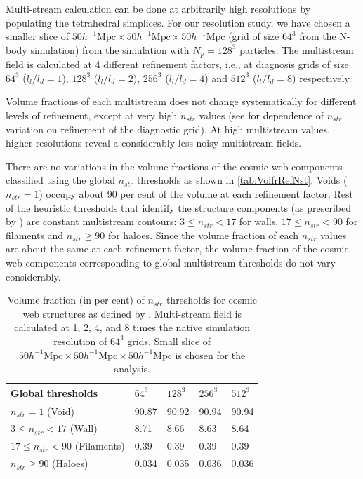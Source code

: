 Multi-stream calculation can be done at arbitrarily high resolutions by populating the tetrahedral simplices. For our resolution study, we have chosen a smaller slice of $ 50 h^{-1} \text{Mpc} \times 50 h^{-1} \text{Mpc} \times 50 h^{-1} \text{Mpc}$ (grid of size $64^3$ from the N-body simulation) from the simulation with $N_p = 128^3$ particles. The multistream field is calculated at 4 different refinement factors, i.e., at diagnosis grids of size $64^3$ ($l_l/l_d = 1$), $128^3$ ($l_l/l_d = 2$), $256^3$ ($l_l/l_d = 4$)  and $512^3$ ($l_l/l_d = 8$) respectively.

Volume fractions of each multistream does not change systematically for different levels of refinement, except at very high $n_{str}$ values (see \citealt{Ramachandra2015} for dependence of $n_{str}$ variation on refinement of the diagnostic grid). At high multistream values, higher resolutions reveal a considerably less noisy multistream fields. 

There are no variations in the volume fractions of the cosmic web components classified using the global $n_{str}$ thresholds as shown in \autoref{tab:VolfrRefNst}. Voids ($n_{str} = 1$) occupy about 90 per cent of the volume at each refinement factor. Rest of the heuristic thresholds that identify the structure components (as prescribed by \citealt{Ramachandra2015}) are constant multistream contours: $3 \leq n_{str} < 17$ for walls, $17 \leq n_{str} < 90 $ for filaments and $n_{str} \geq 90 $ for haloes. Since the volume fraction of each $n_{str}$ values are about the same at each refinement factor, the volume fraction of the cosmic web components corresponding to global multistream thresholds do not vary considerably. 


\begin{table}
\centering
\caption{Volume fraction (in per cent) of $n_{str}$ thresholds for cosmic web structures as defined by \protect\cite{Ramachandra2015}. Multi-stream field is calculated at 1, 2, 4, and 8 times the native simulation resolution of $64^3$ grids. Small slice of $ 50 h^{-1} \text{Mpc} \times 50 h^{-1} \text{Mpc} \times 50 h^{-1} \text{Mpc} $ is chosen for the analysis.}
\begin{tabular}{|l|l|l|l|l|}
\hline
Global thresholds  & $64^3$   & $128^3$   & $256^3$  & $512^3$ \\  \hline
$n_{str} = 1$ (Void)     &    90.87   & 90.92  & 90.94 & 90.94 \\ \hline
$3 \leq n_{str} < 17$ (Wall)  & 8.71 & 8.66 & 8.63 & 8.64   \\ \hline
$17 \leq n_{str} < 90 $ (Filaments) &  0.39 & 0.39 & 0.39 & 0.39    \\ \hline
$n_{str} \geq 90 $ (Haloes) & 0.034 & 0.035 & 0.036 & 0.036 \\ \hline

\end{tabular}
\label{tab:VolfrRefNst}
\end{table}



